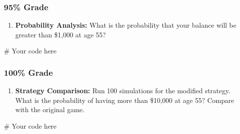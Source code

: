 \documentclass[
  letterpaper,
  DIV=11,
  numbers=noendperiod]{scrartcl}
\newenvironment{Shaded}{\begin{snugshade}}{\end{snugshade}}
\newcommand{\CommentTok}[1]{\textcolor[rgb]{0.37,0.37,0.37}{#1}}
\providecommand{\tightlist}{%
  \setlength{\itemsep}{0pt}\setlength{\parskip}{0pt}}
\begin{document}
\subsubsection{95\% Grade}\label{grade-2}

\begin{enumerate}
\def\labelenumi{\arabic{enumi}.}
\setcounter{enumi}{4}
\tightlist
\item
  \textbf{Probability Analysis:} What is the probability that your
  balance will be greater than \$1,000 at age 55?
\end{enumerate}

\begin{Shaded}
\begin{Highlighting}[]
\CommentTok{\# Your code here}
\end{Highlighting}
\end{Shaded}

\subsubsection{100\% Grade}\label{grade-3}

\begin{enumerate}
\def\labelenumi{\arabic{enumi}.}
\setcounter{enumi}{5}
\tightlist
\item
  \textbf{Strategy Comparison:} Run 100 simulations for the modified
  strategy. What is the probability of having more than \$10,000 at age
  55? Compare with the original game.
\end{enumerate}

\begin{Shaded}
\begin{Highlighting}[]
\CommentTok{\# Your code here}
\end{Highlighting}
\end{Shaded}
\end{document}
